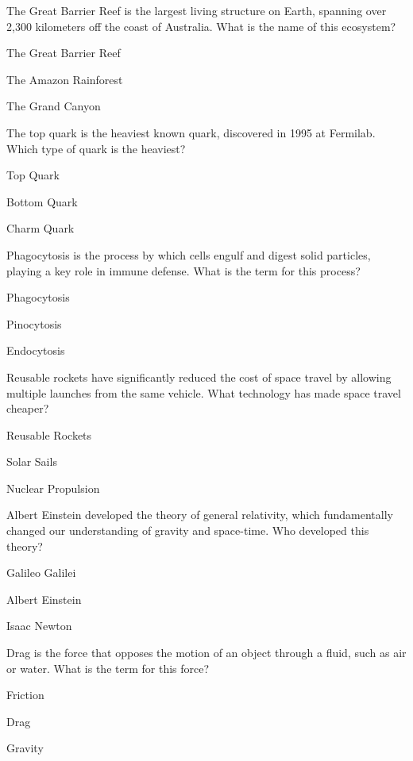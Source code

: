 \begin{enhancedmcq}{The Great Barrier Reef is the largest living structure on Earth, spanning over 2,300 kilometers off the coast of Australia. What is the name of this ecosystem?}
\item The Great Barrier Reef
\item The Amazon Rainforest
\item The Grand Canyon

\end{enhancedmcq}
\begin{enhancedmcq}{The top quark is the heaviest known quark, discovered in 1995 at Fermilab. Which type of quark is the heaviest?}
\item Top Quark
\item Bottom Quark
\item Charm Quark

\end{enhancedmcq}
\begin{enhancedmcq}{Phagocytosis is the process by which cells engulf and digest solid particles, playing a key role in immune defense. What is the term for this process?}
\item Phagocytosis
\item Pinocytosis
\item Endocytosis

\end{enhancedmcq}
\begin{enhancedmcq}{Reusable rockets have significantly reduced the cost of space travel by allowing multiple launches from the same vehicle. What technology has made space travel cheaper?}
\item Reusable Rockets
\item Solar Sails
\item Nuclear Propulsion

\end{enhancedmcq}
\begin{enhancedmcq}{Albert Einstein developed the theory of general relativity, which fundamentally changed our understanding of gravity and space-time. Who developed this theory?}
\item Galileo Galilei
\item Albert Einstein
\item Isaac Newton

\end{enhancedmcq}
\begin{enhancedmcq}{Drag is the force that opposes the motion of an object through a fluid, such as air or water. What is the term for this force?}
\item Friction
\item Drag
\item Gravity

\end{enhancedmcq}
